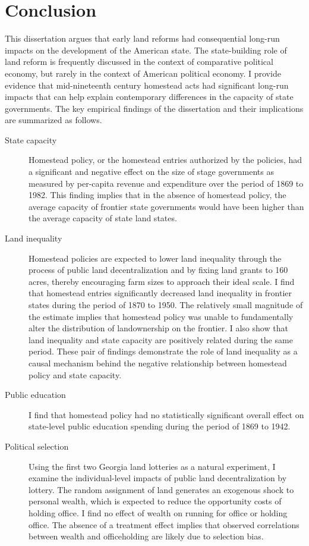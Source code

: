 \chapter{Conclusion} \label{diss-conclusion}

This dissertation argues that early land reforms had consequential long-run impacts on the development of the American state. The state-building role of land reform is frequently discussed in the context of comparative political economy, but rarely in the context of American political economy. I provide evidence that mid-nineteenth century homestead acts had significant long-run impacts that can help explain contemporary differences in the capacity of state governments. The key empirical findings of the dissertation and their implications are summarized as follows.

\begin{description}
	\item[State capacity] Homestead policy, or the homestead entries authorized by the policies, had a significant and negative effect on the size of stage governments as measured by per-capita revenue and expenditure over the period of 1869 to 1982. This finding implies that in the absence of homestead policy, the average capacity of frontier state governments would have been higher than the average capacity of state land states. 
	
	\item[Land inequality] Homestead policies are expected to lower land inequality through the process of public land decentralization and by fixing land grants to 160 acres, thereby encouraging farm sizes to approach their ideal scale. I find that homestead entries significantly decreased land inequality in frontier states during the period of 1870 to 1950. The relatively small magnitude of the estimate implies that homestead policy was unable to fundamentally alter the distribution of landownership on the frontier. I also show that land inequality and state capacity are positively related during the same period. These pair of findings demonstrate the role of land inequality as a causal mechanism behind the negative relationship between homestead policy and state capacity. 
	
	\item[Public education] I find that homestead policy had no statistically significant overall effect on state-level public education spending during the period of 1869 to 1942. 
	
	\item[Political selection] Using the first two Georgia land lotteries as a natural experiment, I examine the individual-level impacts of public land decentralization by lottery. The random assignment of land generates an exogenous shock to personal wealth, which is expected to reduce the opportunity costs of holding office. I find no effect of wealth on running for office or holding office. The absence of a treatment effect implies that observed  correlations between wealth and officeholding are likely due to selection bias.
	
\end{description}

